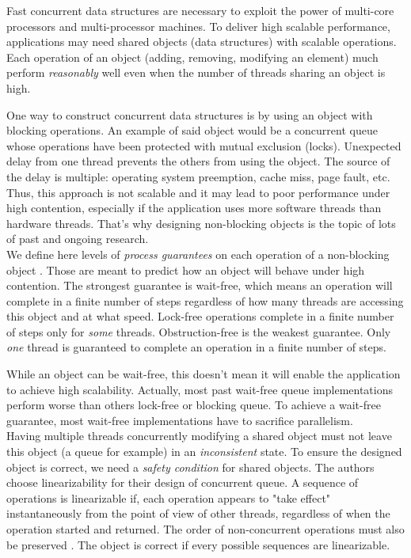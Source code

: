 Fast concurrent data structures are necessary to exploit the power of multi-core
processors and multi-processor machines. To deliver high scalable performance,
applications may need shared objects (data structures) with scalable operations.
Each operation of an object (adding, removing, modifying an element) much
perform \textit{reasonably} well even when the number of threads sharing an
object is high.

One way to construct concurrent data structures is by using an object with
blocking operations. An example of said object would be a concurrent queue whose
operations have been protected with mutual exclusion (locks). Unexpected delay
from one thread prevents the others from using the object. The source of the
delay is multiple: operating system preemption, cache miss, page fault, etc.
Thus, this approach is not scalable and it may lead to poor performance under
high contention, especially if the application uses more software threads than
hardware threads. That's why designing non-blocking objects is the topic of lots
of past and ongoing research. \\

 We define here levels of \textit{process guarantees} on
each operation of a non-blocking object \cite{Yang:2016:WQF:3016078.2851168}.
Those are meant to predict how an object will behave under high contention. The
strongest guarantee is wait-free, which means an operation will complete in a
finite number of steps regardless of how many threads are accessing this object
and at what speed. Lock-free operations complete in a finite number of steps
only for \textit{some} threads. Obstruction-free is the weakest guarantee. Only
\textit{one} thread is guaranteed to complete an operation in a finite number of
steps.

While an object can be wait-free, this doesn't mean it will enable the
application to achieve high scalability. Actually, most past wait-free queue
implementations perform worse than others lock-free or blocking queue. To
achieve a wait-free guarantee, most wait-free implementations have to sacrifice
parallelism. \\

 Having multiple threads concurrently modifying a shared
object must not leave this object (a queue for example) in an
\textit{inconsistent} state. To ensure the designed object is correct, we need a
\textit{safety condition} for shared objects. The authors choose linearizability
for their design of concurrent queue. A sequence of operations is linearizable
if, each operation appears to "take effect" instantaneously from the point of
view of other threads, regardless of when the operation started and returned.
The order of non-concurrent operations must also be preserved
\cite{Herlihy:1990:LCC:78969.78972}. The object is correct if every possible
sequences are linearizable.

